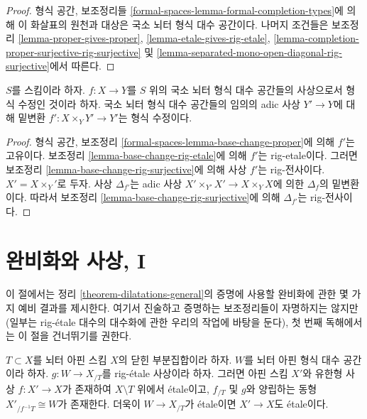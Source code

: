 \begin{proof}
형식 공간, 보조정리들
\ref{formal-spaces-lemma-formal-completion-types}에 의해 이 화살표의
원천과 대상은 국소 뇌터 형식 대수 공간이다.
나머지 조건들은 보조정리
\ref{lemma-proper-gives-proper},
\ref{lemma-etale-gives-rig-etale},
\ref{lemma-completion-proper-surjective-rig-surjective} 및
\ref{lemma-separated-mono-open-diagonal-rig-surjective}에서 따른다.
\end{proof}

\begin{lemma}
\label{lemma-base-change-formal-modification}
$S$를 스킴이라 하자. $f : X \to Y$를 $S$ 위의 국소 뇌터
형식 대수 공간들의 사상으로서 형식 수정인 것이라 하자.
국소 뇌터 형식 대수 공간들의 임의의 adic 사상 $Y' \to Y$에 대해
밑변환 $f' : X \times_Y Y' \to Y'$는 형식 수정이다.
\end{lemma}

\begin{proof}
형식 공간, 보조정리
\ref{formal-spaces-lemma-base-change-proper}에 의해 $f'$는 고유이다.
보조정리 \ref{lemma-base-change-rig-etale}에 의해 $f'$는 rig-etale이다.
그러면 보조정리 \ref{lemma-base-change-rig-surjective}에 의해
사상 $f'$는 rig-전사이다.
$X' = X \times_ Y'$로 두자. 사상 $\Delta_{f'}$는 adic 사상
$X' \times_{Y'} X' \to X \times_Y X$에 의한 $\Delta_f$의 밑변환이다.
따라서 보조정리 \ref{lemma-base-change-rig-surjective}에 의해
$\Delta_{f'}$는 rig-전사이다.
\end{proof}

\section{완비화와 사상, I}
\label{section-completion-and-morphisms}

\noindent
이 절에서는 정리 \ref{theorem-dilatations-general}의 증명에 사용할
완비화에 관한 몇 가지 예비 결과를 제시한다. 여기서 진술하고 증명하는
보조정리들이 자명하지는 않지만(일부는 rig-\'etale 대수의 대수화에 관한
우리의 작업에 바탕을 둔다), 첫 번째 독해에서는 이 절을 건너뛰기를
권한다.

\begin{lemma}
\label{lemma-algebraize-rig-etale-affine}
$T \subset X$를 뇌터 아핀 스킴 $X$의 닫힌 부분집합이라 하자.
$W$를 뇌터 아핀 형식 대수 공간이라 하자.
$g : W \to X_{/T}$를 rig-\'etale 사상이라 하자. 그러면 아핀 스킴
$X'$와 유한형 사상 $f : X' \to X$가 존재하여
$X \setminus T$ 위에서 \'etale이고, $f_{/T}$ 및 $g$와 양립하는 동형
$X'_{/f^{-1}T} \cong W$가 존재한다.
더욱이 $W \to X_{/T}$가 \'etale이면 $X' \to X$도 \'etale이다.
\end{lemma}

